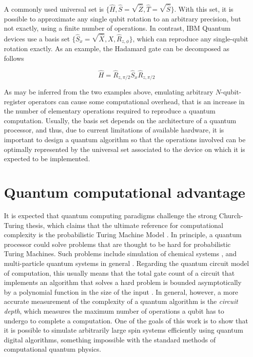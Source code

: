   A commonly used universal set is $\{\hat{H}, \hat{S} = \sqrt{\hat{Z}}, \hat{T} = \sqrt{\hat{S}}\}$. With this set, it is possible to approximate any single qubit rotation to an arbitrary precision, but not exactly, using a finite number of operations. In contrast, IBM Quantum devices use a basis set $\{\hat{S}_x = \sqrt{\hat{X}}, \hat{X}, \hat{R}_{z,\phi} \}$, which can reproduce any single-qubit rotation exactly. As an example, the Hadamard gate can be decomposed as follows

  \begin{equation}
    \hat{H} = \hat{R}_{z,\pi/2} \hat{S}_x \hat{R}_{z,\pi/2}
    \label{eq:hadamard-decomp}
  \end{equation}

  As may be inferred from the two examples above, emulating arbitrary $N$-qubit-register operators can cause some computational overhead, that is an increase in the number of elementary operations required to reproduce a quantum computation. Usually, the basis set depends on the architecture of a quantum processor, and thus, due to current limitations of available hardware, it is important to design a quantum algorithm so that the operations involved can be optimally represented by the universal set associated to the device on which it is expected to be implemented.

\section{Quantum computational advantage}
  
  It is expected that quantum computing paradigms challenge the strong Church-Turing thesis, which claims that the ultimate reference for computational complexity is the probabilistic Turing Machine Model \cite{Nielsen, Strini}. In principle, a quantum processor could solve problems that are thought to be hard for probabilistic Turing Machines. Such problems include simulation of chemical systems \cite{QuantumChem1, QuantumChem2}, and multi-particle quantum systems in general \cite{Nielsen, LloydFermSim, BerryErrorBounds}. Regarding the quantum circuit model of computation, this usually means that the total gate count of a circuit that implements an algorithm that solves a hard problem is bounded asymptotically by a polynomial function in the size of the input \cite{Nielsen, Strini}. In general, however, a more accurate measurement of the complexity of a quantum algorithm is the \textit{circuit depth}, which measures the maximum number of operations a qubit has to undergo to complete a computation. One of the goals of this work is to show that it is possible to simulate arbitrarily large spin systems efficiently using quantum digital algorithms, something impossible with the standard methods of computational quantum physics.